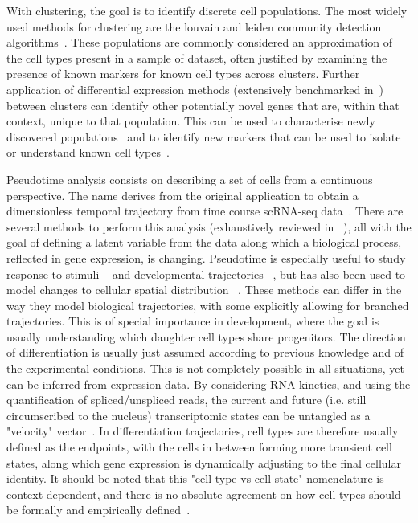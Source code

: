 With clustering, the goal is to identify discrete cell populations. The most widely used methods for clustering are the louvain and leiden community detection algorithms~\citep{blondel_fast_2008,traag_louvain_2019}. These populations are commonly considered an approximation of the cell types present in a sample of dataset, often justified by examining the presence of known markers for known cell types across clusters. Further application of differential expression methods (extensively benchmarked in~\citep{soneson_bias_2018}) between clusters can identify other potentially novel genes that are, within that context, unique to that population. This can be used to characterise newly discovered populations~\citep{villani_single-cell_2017,montoro_revised_2018,shekhar_comprehensive_2016} and to identify new markers that can be used to isolate or understand known cell types~\citep{shulse_high-throughput_2019,vento-tormo_single-cell_2018,bjorklund_heterogeneity_2016}.

Pseudotime analysis consists on describing a set of cells from a continuous perspective. The name derives from the original application to obtain a dimensionless temporal trajectory from time course scRNA-seq data~\citep{trapnell_dynamics_2014}. There are several methods to perform this analysis (exhaustively reviewed in ~\citep{saelens_comparison_2019}), all with the goal of defining a latent variable from the data along which a biological process, reflected in gene expression, is changing. Pseudotime is especially useful to study response to stimuli ~\citep{trapnell_dynamics_2014,lonnberg_single-cell_2017} and developmental trajectories ~\citep{cao_single-cell_2019,watcham_new_2019}, but has also been used to model changes to cellular spatial distribution ~\citep{scialdone_resolving_2016}. These methods can differ in the way they model biological trajectories, with some explicitly allowing for branched trajectories. This is of special importance in development, where the goal is usually understanding which daughter cell types share  progenitors. The direction of differentiation is usually just assumed according to previous knowledge and of the experimental conditions. This is not completely possible in all situations, yet can be inferred from expression data. By considering RNA kinetics, and using the quantification of spliced/unspliced reads, the current and future (i.e. still circumscribed to the nucleus) transcriptomic states can be untangled as a "velocity" vector~\citep{manno_rna_2018}. In differentiation trajectories, cell types are therefore usually defined as the endpoints, with the cells in between forming more transient cell states, along which gene expression is dynamically adjusting to the final cellular identity. It should be noted that this "cell type vs cell state" nomenclature is context-dependent, and there is no absolute agreement on how cell types should be formally and empirically defined~\citep{noauthor_what_2017}. 

